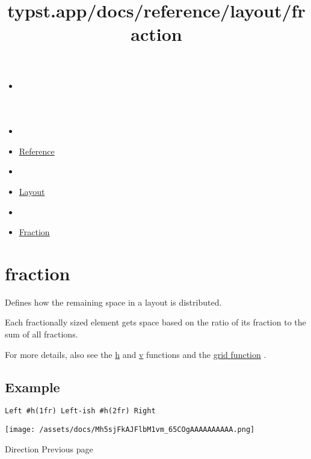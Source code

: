 \title{typst.app/docs/reference/layout/fraction}

\begin{itemize}
\tightlist
\item
  \href{/docs}{}
\item
  
\item
  \href{/docs/reference/}{Reference}
\item
  
\item
  \href{/docs/reference/layout/}{Layout}
\item
  
\item
  \href{/docs/reference/layout/fraction/}{Fraction}
\end{itemize}

\section{\texorpdfstring{{ fraction }}{ fraction }}\label{summary}

Defines how the remaining space in a layout is distributed.

Each fractionally sized element gets space based on the ratio of its
fraction to the sum of all fractions.

For more details, also see the \href{/docs/reference/layout/h/}{h} and
\href{/docs/reference/layout/v/}{v} functions and the
\href{/docs/reference/layout/grid/}{grid function} .

\subsection{Example}\label{example}

\begin{verbatim}
Left #h(1fr) Left-ish #h(2fr) Right
\end{verbatim}

\texttt{[image: /assets/docs/Mh5sjFkAJFlbM1vm\_65COgAAAAAAAAAA.png]}

\href{/docs/reference/layout/direction/}{\pandocbounded{}}

{ Direction } { Previous page }

\href{/docs/reference/layout/grid/}{\pandocbounded{}}

